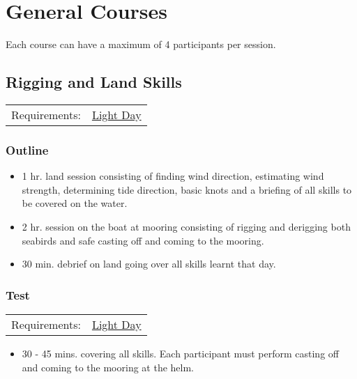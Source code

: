 \documentclass[12pt]{scrartcl}
\begin{document}
\section{General Courses} \label{sec:general courses}

Each course can have a maximum of 4 participants per session.

\subsection{Rigging and Land Skills} \label{subsec:rigging and land skills}

\label{tab:rigging and land skills:requirements}
\begin{tabular}{ll}
	Requirements: & \hyperlink{condition:light day}{Light Day} \\
\end{tabular}

\subsubsection{Outline} \label{subsubsec:rigging and land skills:outline}

\begin{itemize}
	\item 1 hr. land session consisting of finding wind direction, estimating wind strength, determining tide direction, basic knots and a briefing of all skills to be covered on the water.
	\item 2 hr. session on the boat at mooring consisting of rigging and derigging both seabirds and safe casting off and coming to the mooring.
	\item 30 min. debrief on land going over all skills learnt that day.
\end{itemize}

\subsubsection{Test} \label{subsubsec:rigging and land skills:test}

\label{tab:rigging and land skills:test:requirements}
\begin{tabular}{ll}
	Requirements: & \hyperlink{condition:light day}{Light Day} \\
\end{tabular}

\begin{itemize}
	\item 30 - 45 mins. covering all skills. Each participant must perform casting off and coming to the mooring at the helm.
\end{itemize}
\end{document}
